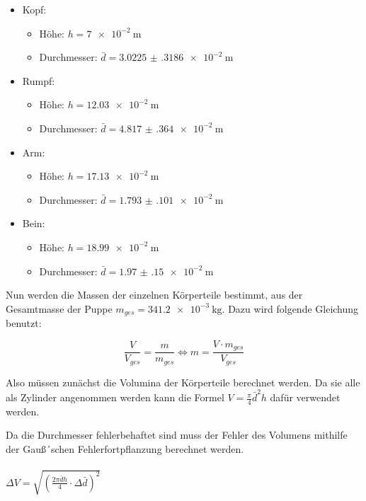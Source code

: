 \begin{itemize}
  \item Kopf:
    \begin{itemize}
      \item Höhe: $h = \SI{7e-2}{\meter}$
      \item Durchmesser: $\bar{d} = \SI{3.0225(3186)e-2}{\meter}$
    \end{itemize}
  \item Rumpf:
    \begin{itemize}
      \item Höhe: $h = \SI{12.03e-2}{\meter}$
      \item Durchmesser: $\bar{d} = \SI{4.817(364)e-2}{\meter}$
    \end{itemize}
  \item Arm:
    \begin{itemize}
      \item Höhe: $h = \SI{17.13e-2}{\meter}$
      \item Durchmesser: $\bar{d} = \SI{1.793(101)e-2}{\meter}$
    \end{itemize}
  \item Bein:
    \begin{itemize}
      \item Höhe: $h = \SI{18.99e-2}{\meter}$
      \item Durchmesser: $\bar{d} = \SI{1.97(15)e-2}{\meter}$
    \end{itemize}
\end{itemize}

Nun werden die Massen der einzelnen Körperteile bestimmt, aus der Gesamtmasse der
Puppe $m_{ges} = \SI{341.2e-3}{\kilo\gram}$. Dazu wird folgende Gleichung benutzt:

\begin{equation}
  \frac{V}{V_{ges}} = \frac{m}{m_{ges}} \iff m = \frac{V \cdot m_{ges}}{V_{ges}}
\end{equation}

Also müssen zunächst die Volumina der Körperteile berechnet werden. Da sie alle als
Zylinder angenommen werden kann die Formel $V = \frac{\pi}{4} \bar{d}^2 h$ dafür verwendet
werden.

Da die Durchmesser fehlerbehaftet sind muss der Fehler des Volumens mithilfe der
Gauß´schen Fehlerfortpflanzung berechnet werden.\\\\

$\Delta V = \sqrt{\left(\frac{2\pi\bar{d}h}{4} \cdot \Delta \bar{d} \right)^2}$\\\\

